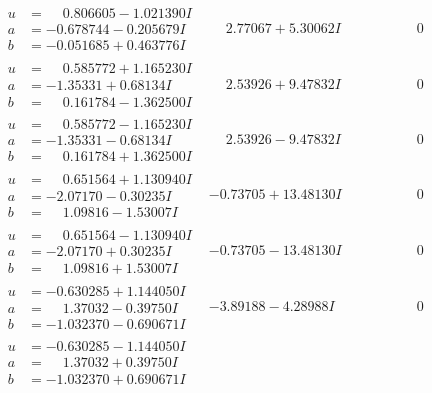 \documentclass[1p]{elsarticle_modified}
\theoremstyle{definition}
\begin{document}
$$\begin{array}{c|c|c}
\begin{aligned}
u &= \phantom{-}0.806605 - 1.021390 I \\
a &= -0.678744 - 0.205679 I \\
b &= -0.051685 + 0.463776 I\end{aligned}
 & \phantom{-}2.77067 + 5.30062 I & \phantom{-0.000000 } 0 \\ \hline\begin{aligned}
u &= \phantom{-}0.585772 + 1.165230 I \\
a &= -1.35331 + 0.68134 I \\
b &= \phantom{-}0.161784 - 1.362500 I\end{aligned}
 & \phantom{-}2.53926 + 9.47832 I & \phantom{-0.000000 } 0 \\ \hline\begin{aligned}
u &= \phantom{-}0.585772 - 1.165230 I \\
a &= -1.35331 - 0.68134 I \\
b &= \phantom{-}0.161784 + 1.362500 I\end{aligned}
 & \phantom{-}2.53926 - 9.47832 I & \phantom{-0.000000 } 0 \\ \hline\begin{aligned}
u &= \phantom{-}0.651564 + 1.130940 I \\
a &= -2.07170 - 0.30235 I \\
b &= \phantom{-}1.09816 - 1.53007 I\end{aligned}
 & -0.73705 + 13.48130 I & \phantom{-0.000000 } 0 \\ \hline\begin{aligned}
u &= \phantom{-}0.651564 - 1.130940 I \\
a &= -2.07170 + 0.30235 I \\
b &= \phantom{-}1.09816 + 1.53007 I\end{aligned}
 & -0.73705 - 13.48130 I & \phantom{-0.000000 } 0 \\ \hline\begin{aligned}
u &= -0.630285 + 1.144050 I \\
a &= \phantom{-}1.37032 - 0.39750 I \\
b &= -1.032370 - 0.690671 I\end{aligned}
 & -3.89188 - 4.28988 I & \phantom{-0.000000 } 0 \\ \hline\begin{aligned}
u &= -0.630285 - 1.144050 I \\
a &= \phantom{-}1.37032 + 0.39750 I \\
b &= -1.032370 + 0.690671 I\end{aligned}

\end{array}$$
\end{document}
